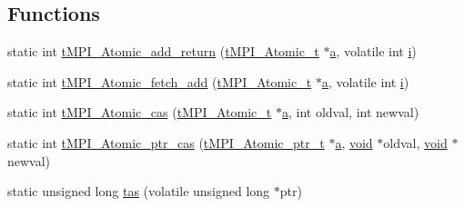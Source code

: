 \subsection*{\-Functions}
\begin{DoxyCompactItemize}
\item 
static int \hyperlink{share_2template_2gromacs_2thread__mpi_2atomic_2suncc-sparc_8h_a6ceb01ee4b7be348a054f89eef35cb32}{t\-M\-P\-I\-\_\-\-Atomic\-\_\-add\-\_\-return} (\hyperlink{include_2thread__mpi_2atomic_2gcc_8h_a2c33794dc540e3b07cffc1f81a3fe4b4}{t\-M\-P\-I\-\_\-\-Atomic\-\_\-t} $\ast$\hyperlink{share_2template_2gromacs_2gmx__lapack_8h_a0880879736d1ab747a972d1942421886}{a}, volatile int \hyperlink{share_2template_2gromacs_2gmx__lapack_8h_a3c7542401c1cb8bd37ef5e7d9eb0f5a8}{i})
\item 
static int \hyperlink{share_2template_2gromacs_2thread__mpi_2atomic_2suncc-sparc_8h_a09aacccd7fa0170f90856714a40c2a5a}{t\-M\-P\-I\-\_\-\-Atomic\-\_\-fetch\-\_\-add} (\hyperlink{include_2thread__mpi_2atomic_2gcc_8h_a2c33794dc540e3b07cffc1f81a3fe4b4}{t\-M\-P\-I\-\_\-\-Atomic\-\_\-t} $\ast$\hyperlink{share_2template_2gromacs_2gmx__lapack_8h_a0880879736d1ab747a972d1942421886}{a}, volatile int \hyperlink{share_2template_2gromacs_2gmx__lapack_8h_a3c7542401c1cb8bd37ef5e7d9eb0f5a8}{i})
\item 
static int \hyperlink{share_2template_2gromacs_2thread__mpi_2atomic_2suncc-sparc_8h_a31f290e3623634761306d9ea0e413c7e}{t\-M\-P\-I\-\_\-\-Atomic\-\_\-cas} (\hyperlink{include_2thread__mpi_2atomic_2gcc_8h_a2c33794dc540e3b07cffc1f81a3fe4b4}{t\-M\-P\-I\-\_\-\-Atomic\-\_\-t} $\ast$\hyperlink{share_2template_2gromacs_2gmx__lapack_8h_a0880879736d1ab747a972d1942421886}{a}, int oldval, int newval)
\item 
static int \hyperlink{share_2template_2gromacs_2thread__mpi_2atomic_2suncc-sparc_8h_a93c275574896fdd671df8a909d9feb37}{t\-M\-P\-I\-\_\-\-Atomic\-\_\-ptr\-\_\-cas} (\hyperlink{include_2thread__mpi_2atomic_2gcc_8h_a4c91c0105f1c0a5f23bc4239274291eb}{t\-M\-P\-I\-\_\-\-Atomic\-\_\-ptr\-\_\-t} $\ast$\hyperlink{share_2template_2gromacs_2gmx__lapack_8h_a0880879736d1ab747a972d1942421886}{a}, \hyperlink{nbnxn__kernel__simd__4xn__outer_8h_a8dc3f4a797ed992dff49d2fa3477eee8}{void} $\ast$oldval, \hyperlink{nbnxn__kernel__simd__4xn__outer_8h_a8dc3f4a797ed992dff49d2fa3477eee8}{void} $\ast$newval)
\item 
static unsigned long \hyperlink{share_2template_2gromacs_2thread__mpi_2atomic_2suncc-sparc_8h_a8a6227274795631e6766287e0ebe9751}{tas} (volatile unsigned long $\ast$ptr)

\end{DoxyCompactItemize}
